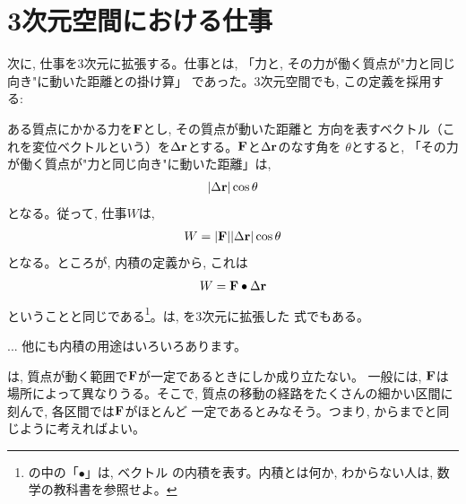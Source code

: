 \section{3次元空間における仕事}

次に, 仕事を3次元に拡張する。仕事とは, 「力と, その力が働く質点が"力と同じ向き"に動いた距離との掛け算」
であった。3次元空間でも, この定義を採用する:

ある質点にかかる力を${\bf F}$とし, その質点が動いた距離と
方向を表すベクトル（これを変位ベクトルという）を$\Delta{\bf r}$とする。${\bf F}$と$\Delta{\bf r}$のなす角を
$\theta$とすると, 「その力が働く質点が"力と同じ向き"に動いた距離」は, 
\begin{eqnarray} 
|\Delta{\bf r}|\cos\theta
\end{eqnarray} 
となる。従って, 仕事$W$は, 
\begin{eqnarray} 
W=|{\bf F}||\Delta{\bf r}|\cos\theta
\end{eqnarray} 
となる。ところが, 内積の定義から, これは
\begin{eqnarray} 
W={\bf F}\bullet\Delta{\bf r}\label{eq:work_Fdotdr}
\end{eqnarray} 
ということと同じである\footnote{の中の「$\bullet$」は, ベクトル
の内積を表す。内積とは何か, わからない人は, 
数学の教科書を参照せよ。}。は, を3次元に拡張した
式でもある。

\begin{faq}{\small{} ... 
他にも内積の用途はいろいろあります。}\end{faq}\mv

は, 質点が動く範囲で${\bf F}$が一定であるときにしか成り立たない。
一般には, ${\bf F}$は場所によって異なりうる。そこで, 
質点の移動の経路をたくさんの細かい区間に刻んで, 各区間では${\bf F}$がほとんど
一定であるとみなそう。つまり, からまでと同じように考えればよい。

